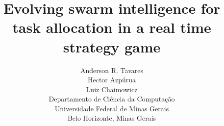 \documentclass[a4paper]{sbgames}
\begin{document}
%
\title{Evolving swarm intelligence for task allocation in a real time strategy game}


\author{Anderson R. Tavares \\Hector Azpúrua \\Luiz Chaimowicz \\
Departamento de Ci\^encia da Computa\c c\~ao\\
Universidade Federal de Minas Gerais\\
Belo Horizonte, Minas Gerais }



 

\newcommand{\agentset}{\mathcal{I}}
\newcommand{\taskset}{\mathcal{J}}

\newcommand{\agtres}[1]{\ensuremath{r_{#1}}}
\newcommand{\agtcap}[2]{\ensuremath{k_{#1#2}}}
\newcommand{\rescspt}[2]{\ensuremath{c_{#1#2}}}

\newcommand{\stimulus}[1]{\ensuremath{s_#1}}
\newcommand{\respthresh}[2]{\ensuremath{\theta_{#1#2}}}
\newcommand{\tendency}[2]{\ensuremath{T_{#1#2}}}

\newcommand{\pop}[1]{\ensuremath{P^{(#1)}}}
\newcommand{\fit}[1]{\ensuremath{f_{#1}}}
\newcommand{\reliab}[1]{\ensuremath{w_{#1}}}
\newcommand{\simil}[2]{\ensuremath{\rho_{#1#2}}}
\newcommand{\relthresh}{\ensuremath{\tau}}

\newcommand{\popmax}{\ensuremath{\kappa}}
\newcommand{\genmax}{\ensuremath{\eta}}


\maketitle
\end{document}

